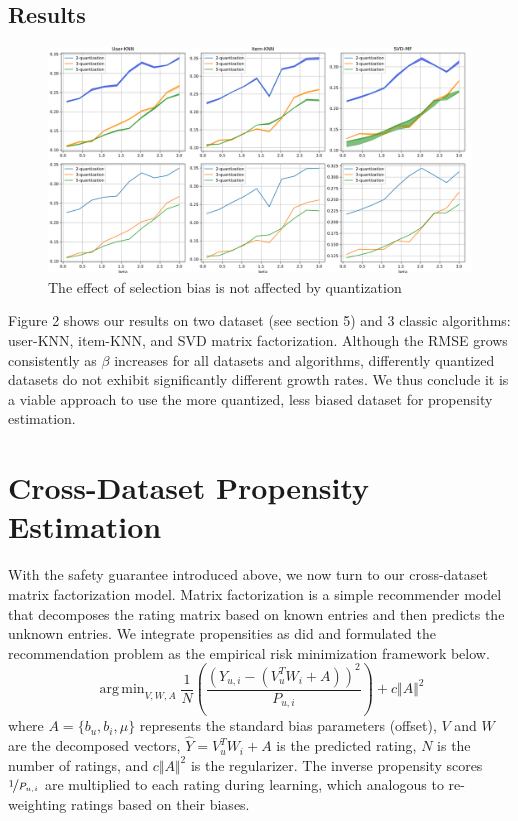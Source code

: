 \documentclass{article}
\DeclareMathOperator*{\argmin}{arg\,min}
\begin{document}
\subsection{Results}
\begin{figure}
  \centering
  \includegraphics[width=\textwidth]{1.png}
  \caption{The effect of selection bias is not affected by quantization}
\end{figure}
Figure 2 shows our results on two dataset (see section 5) and 3 classic algorithms: user-KNN, item-KNN, and SVD matrix factorization. Although the RMSE grows consistently as $\beta$ increases for all datasets and algorithms, differently quantized datasets do not exhibit significantly different growth rates. We thus conclude it is a viable approach to use the more quantized, less biased dataset for propensity estimation.

\section{Cross-Dataset Propensity Estimation}
With the safety guarantee introduced above, we now turn to our cross-dataset matrix factorization model. Matrix factorization is a simple recommender model that decomposes the rating matrix based on known entries and then predicts the unknown entries\cite{koren2009matrix}. We integrate propensities as \cite{schnabel2016recommendations} did and formulated the recommendation problem as the empirical risk minimization framework below. 
\begin{equation} \argmin_{V,W,A} \frac{1}{N}\left(\frac{(Y_{u,i}- (V_u^TW_i + A))^2}{P_{u,i}} \right) + c \Vert A \Vert^2
\end{equation}
where $A = \{ b_u, b_i, \mu \}$ represents the standard bias parameters (offset), $V$ and $W$ are the decomposed vectors, $\hat{Y} = V_u^TW_i + A$ is the predicted rating, $N$ is the number of ratings, and $c \Vert A \Vert^2$ is the regularizer. The inverse propensity scores $\nicefrac{1}{P_{u,i}}$ are multiplied to each rating during learning, which analogous to re-weighting ratings based on their biases.
\end{document}
